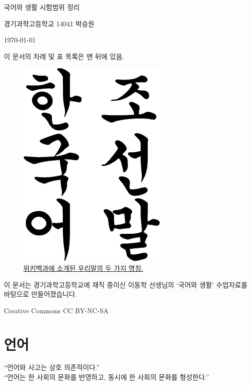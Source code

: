 \documentclass[10pt]{report}
\begin{document}
\begin{center}
	\Large 국어와 생활 시험범위 정리
	\normalsize
	\begin{flushright}
		경기과학고등학교 14041 박승원
		
		\today
	\end{flushright}
	이 문서의 차례 및 표 목록은 맨 뒤에 있음. \color{blue}{\#시험기간이라서}
	\begin{figure}[h]
		\begin{center}
			\includegraphics{Korean.png}
			\caption{\href{https://en.wikipedia.org/wiki/Korean_language}{위키백과에 소개된 우리말의 두 가지 명칭.}}
		\end{center}
	\end{figure}
\end{center}
이 문서는 경기과학고등학교에 재직 중이신 이동학 선생님의 `국어와 생활'  수업자료를 바탕으로 만들어졌습니다.

Creative Commons CC BY-NC-SA


\chapter{언어}
\begin{center}
	``언어와 사고는 상호 의존적이다.'' \\
	``언어는 한 사회의 문화를 반영하고, 동시에 한 사회의 문화를 형성한다.''
\end{center}
\end{document}

